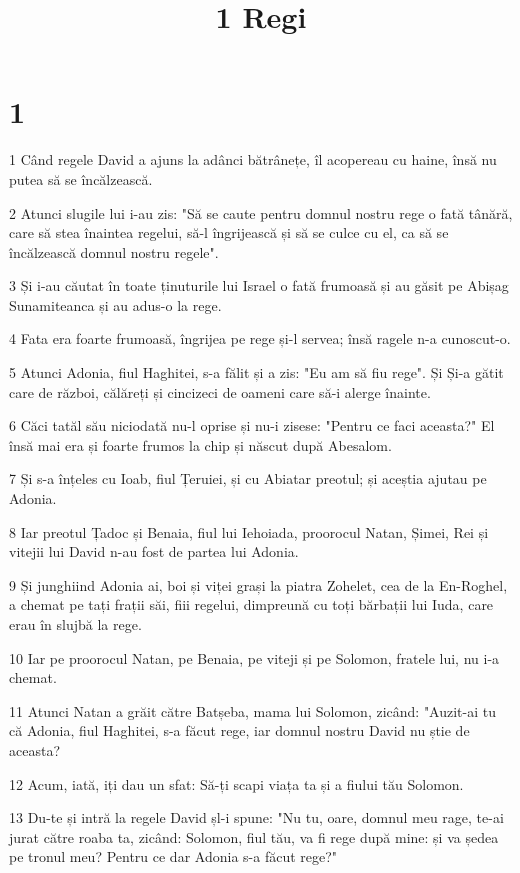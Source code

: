 

\title{1 Regi}


\chapter{1}

\par 1 Când regele David a ajuns la adânci bătrânețe, îl acopereau cu haine, însă nu putea să se încălzească.
\par 2 Atunci slugile lui i-au zis: "Să se caute pentru domnul nostru rege o fată tânără, care să stea înaintea regelui, să-l îngrijească și să se culce cu el, ca să se încălzească domnul nostru regele".
\par 3 Și i-au căutat în toate ținuturile lui Israel o fată frumoasă și au găsit pe Abișag Sunamiteanca și au adus-o la rege.
\par 4 Fata era foarte frumoasă, îngrijea pe rege și-l servea; însă ragele n-a cunoscut-o.
\par 5 Atunci Adonia, fiul Haghitei, s-a fălit și a zis: "Eu am să fiu rege". Și Și-a gătit care de război, călăreți și cincizeci de oameni care să-i alerge înainte.
\par 6 Căci tatăl său niciodată nu-l oprise și nu-i zisese: "Pentru ce faci aceasta?" El însă mai era și foarte frumos la chip și născut după Abesalom.
\par 7 Și s-a înțeles cu Ioab, fiul Țeruiei, și cu Abiatar preotul; și aceștia ajutau pe Adonia.
\par 8 Iar preotul Țadoc și Benaia, fiul lui Iehoiada, proorocul Natan, Șimei, Rei și vitejii lui David n-au fost de partea lui Adonia.
\par 9 Și junghiind Adonia ai, boi și viței grași la piatra Zohelet, cea de la En-Roghel, a chemat pe tați frații săi, fiii regelui, dimpreună cu toți bărbații lui Iuda, care erau în slujbă la rege.
\par 10 Iar pe proorocul Natan, pe Benaia, pe viteji și pe Solomon, fratele lui, nu i-a chemat.
\par 11 Atunci Natan a grăit către Batșeba, mama lui Solomon, zicând: "Auzit-ai tu că Adonia, fiul Haghitei, s-a făcut rege, iar domnul nostru David nu știe de aceasta?
\par 12 Acum, iată, iți dau un sfat: Să-ți scapi viața ta și a fiului tău Solomon.
\par 13 Du-te și intră la regele David șl-i spune: "Nu tu, oare, domnul meu rage, te-ai jurat către roaba ta, zicând: Solomon, fiul tău, va fi rege după mine: și va ședea pe tronul meu? Pentru ce dar Adonia s-a făcut rege?"
